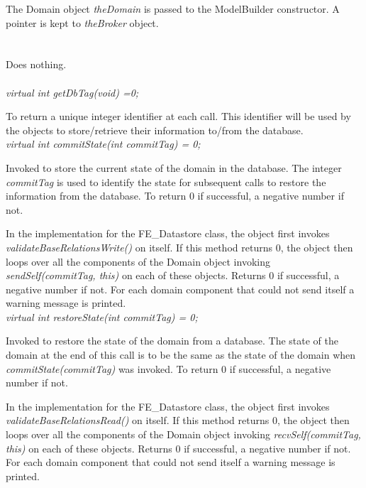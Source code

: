 The Domain object {\em theDomain} is passed to the ModelBuilder
constructor. A pointer is kept to {\em theBroker} object.\\

 \\
\\ 
Does nothing. \\

  \\
{\em virtual int getDbTag(void) =0;}

To return a unique integer identifier at each call. This identifier
will be used by the objects to store/retrieve their information
to/from the database. \\

{\em virtual int commitState(int commitTag) = 0;}

Invoked to store the current state of the domain in the database. The
integer {\em commitTag} is used to identify the state for subsequent
calls to restore the information from the database. To return
$0$ if successful, a negative number if not. 

In the implementation for the FE\_Datastore class, the object first
invokes {\em validateBaseRelationsWrite()} on itself. If this method 
returns $0$, the object then loops over all the components of the
Domain object invoking {\em sendSelf(commitTag, this)} on each of
these objects. Returns $0$ if successful, a negative number if
not. For each domain component that could not send itself a warning
message is printed. \\ 

{\em virtual int restoreState(int commitTag) = 0;}

Invoked to restore the state of the domain from a database. The state
of the domain at the end of this call is to be the same as the state
of the domain when {\em commitState(commitTag)} was invoked. To return
$0$ if successful, a negative number if not. 

In the implementation for the FE\_Datastore class, the object first
invokes {\em validateBaseRelationsRead()} on itself. If this method 
returns $0$, the object then loops over all the components of the
Domain object invoking {\em recvSelf(commitTag, this)} on each of
these objects. Returns $0$ if successful, a negative number if
not. For each domain component that could not send itself a warning
message is printed. \\ 


